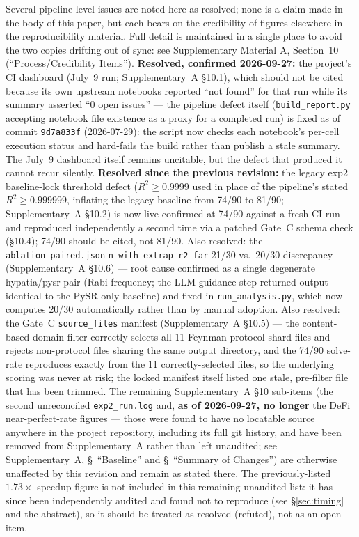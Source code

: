 \documentclass[twoside,11pt]{article}
\begin{document}
Several pipeline-level issues are noted here as resolved; none is a claim
made in the body of this paper, but each bears on the credibility of
figures elsewhere in the reproducibility material. Full detail is
maintained in a single place to avoid the two copies drifting out of
sync: see Supplementary Material A, Section~10 (``Process/Credibility
Items''). \textbf{Resolved, confirmed 2026-09-27:} the project's CI
dashboard (July~9 run; Supplementary~A \S10.1), which should not be
cited because its own upstream notebooks reported ``not found'' for
that run while its summary asserted ``0 open issues'' --- the pipeline
defect itself (\texttt{build\_report.py} accepting notebook file
existence as a proxy for a completed run) is fixed as of commit
\texttt{9d7a833f} (2026-07-29): the script now checks each notebook's
per-cell execution status and hard-fails the build rather than publish a
stale summary. The July~9 dashboard itself remains uncitable, but the
defect that produced it cannot recur silently. \textbf{Resolved since the previous
revision:} the legacy exp2 baseline-lock threshold defect ($R^2 \geq 0.9999$
used in place of the pipeline's stated $R^2 \geq 0.999999$, inflating the
legacy baseline from 74/90 to 81/90; Supplementary~A \S10.2) is now
live-confirmed at 74/90 against a fresh CI run and reproduced independently
a second time via a patched Gate~C schema check (\S10.4); 74/90 should be
cited, not 81/90. Also resolved: the \texttt{ablation\_paired.json}
\texttt{n\_with\_extrap\_r2\_far} 21/30 vs.\ 20/30 discrepancy
(Supplementary~A \S10.6) --- root cause confirmed as a single degenerate
hypatia/pysr pair (Rabi frequency; the LLM-guidance step returned output
identical to the PySR-only baseline) and fixed in
\texttt{run\_analysis.py}, which now computes 20/30 automatically rather
than by manual adoption. Also resolved: the Gate~C \texttt{source\_files}
manifest (Supplementary~A \S10.5) --- the content-based domain filter
correctly selects all 11 Feynman-protocol shard files and rejects
non-protocol files sharing the same output directory, and the 74/90
solve-rate reproduces exactly from the 11 correctly-selected files, so the
underlying scoring was never at risk; the locked manifest itself listed
one stale, pre-filter file that has been trimmed. The remaining
Supplementary~A \S10 sub-items (the second unreconciled
\texttt{exp2\_run.log} and, \textbf{as of 2026-09-27, no longer} the
DeFi near-perfect-rate figures --- those were found to have no locatable
source anywhere in the project repository, including its full git history,
and have been removed from Supplementary~A rather than left unaudited; see
Supplementary~A, \S~``Baseline'' and \S~``Summary of Changes'') are
otherwise unaffected by this revision and remain as stated there. The previously-listed $1.73\times$ speedup figure is not
included in this remaining-unaudited list: it has since been independently
audited and found not to reproduce (see \S\ref{sec:timing} and the
abstract), so it should be treated as resolved (refuted), not as an open
item.
\end{document}
